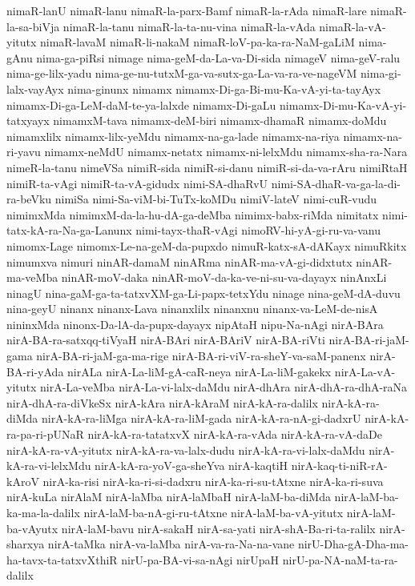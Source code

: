 {nimaR-lanU
nimaR-lanu
nimaR-la-parx-Bamf
nimaR-la-rAda
nimaR-lare
nimaR-la-sa-biVja
nimaR-la-tanu
nimaR-la-ta-nu-vina
nimaR-la-vAda
nimaR-la-vA-yitutx
nimaR-lavaM
nimaR-li-nakaM
nimaR-loV-pa-ka-ra-NaM-gaLiM
nima-gAnu
nima-ga-piRsi
nimage
nima-geM-da-La-va-Di-sida
nimageV
nima-geV-ralu
nima-ge-lilx-yadu
nima-ge-nu-tutxM-ga-va-sutx-ga-La-va-ra-ve-nageVM
nima-gi-lalx-vayAyx
nima-ginunx
nimamx
nimamx-Di-ga-Bi-mu-Ka-vA-yi-ta-tayAyx
nimamx-Di-ga-LeM-daM-te-ya-lalxde
nimamx-Di-gaLu
nimamx-Di-mu-Ka-vA-yi-tatxyayx
nimamxM-tava
nimamx-deM-biri
nimamx-dhamaR
nimamx-doMdu
nimamxlilx
nimamx-lilx-yeMdu
nimamx-na-ga-lade
nimamx-na-riya
nimamx-na-ri-yavu
nimamx-neMdU
nimamx-netatx
nimamx-ni-lelxMdu
nimamx-sha-ra-Nara
nimeR-la-tanu
nimeVSa
nimiR-sida
nimiR-si-danu
nimiR-si-da-va-rAru
nimiRtaH
nimiR-ta-vAgi
nimiR-ta-vA-gidudx
nimi-SA-dhaRvU
nimi-SA-dhaR-va-ga-la-di-ra-beVku
nimiSa
nimi-Sa-viM-bi-TuTx-koMDu
nimiV-lateV
nimi-cuR-vudu
nimimxMda
nimimxM-da-la-hu-dA-ga-deMba
nimimx-babx-riMda
nimitatx
nimi-tatx-kA-ra-Na-ga-Lanunx
nimi-tayx-thaR-vAgi
nimoRV-hi-yA-gi-ru-va-vanu
nimomx-Lage
nimomx-Le-na-geM-da-pupxdo
nimuR-katx-sA-dAKayx
nimuRkitx
nimumxva
nimuri
ninAR-damaM
ninARma
ninAR-ma-vA-gi-didxtutx
ninAR-ma-veMba
ninAR-moV-daka
ninAR-moV-da-ka-ve-ni-su-va-dayayx
ninAnxLi
ninagU
nina-gaM-ga-ta-tatxvXM-ga-Li-papx-tetxYdu
ninage
nina-geM-dA-duvu
nina-geyU
ninanx
ninanx-Lava
ninanxlilx
ninanxnu
ninanx-va-LeM-de-nisA
nininxMda
ninonx-Da-lA-da-pupx-dayayx
nipAtaH
nipu-Na-nAgi
nirA-BAra
nirA-BA-ra-satxqq-tiVyaH
nirA-BAri
nirA-BAriV
nirA-BA-riVti
nirA-BA-ri-jaM-gama
nirA-BA-ri-jaM-ga-ma-rige
nirA-BA-ri-viV-ra-sheY-va-saM-panenx
nirA-BA-ri-yAda
nirALa
nirA-La-liM-gA-caR-neya
nirA-La-liM-gakekx
nirA-La-vA-yitutx
nirA-La-veMba
nirA-La-vi-lalx-daMdu
nirA-dhAra
nirA-dhA-ra-dhA-raNa
nirA-dhA-ra-diVkeSx
nirA-kAra
nirA-kAraM
nirA-kA-ra-dalilx
nirA-kA-ra-diMda
nirA-kA-ra-liMga
nirA-kA-ra-liM-gada
nirA-kA-ra-nA-gi-dadxrU
nirA-kA-ra-pa-ri-pUNaR
nirA-kA-ra-tatatxvX
nirA-kA-ra-vAda
nirA-kA-ra-vA-daDe
nirA-kA-ra-vA-yitutx
nirA-kA-ra-va-lalx-dudu
nirA-kA-ra-vi-lalx-daMdu
nirA-kA-ra-vi-lelxMdu
nirA-kA-ra-yoV-ga-sheYva
nirA-kaqtiH
nirA-kaq-ti-niR-rA-kAroV
nirA-ka-risi
nirA-ka-ri-si-dadxru
nirA-ka-ri-su-tAtxne
nirA-ka-ri-suva
nirA-kuLa
nirAlaM
nirA-laMba
nirA-laMbaH
nirA-laM-ba-diMda
nirA-laM-ba-ka-ma-la-dalilx
nirA-laM-ba-nA-gi-ru-tAtxne
nirA-laM-ba-vA-yitutx
nirA-laM-ba-vAyutx
nirA-laM-bavu
nirA-sakaH
nirA-sa-yati
nirA-shA-Ba-ri-ta-ralilx
nirA-sharxya
nirA-taMka
nirA-va-laMba
nirA-va-ra-Na-na-vane
nirU-Dha-gA-Dha-ma-ha-tavx-ta-tatxvXthiR
nirU-pa-BA-vi-sa-nAgi
nirUpaH
nirU-pa-NA-naM-ta-ra-dalilx
}
